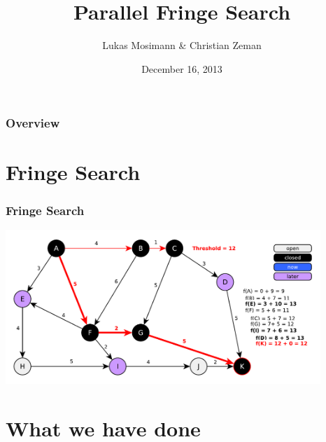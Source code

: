 \documentclass{beamer}
\title[Parallel Fringe Search]{Parallel Fringe Search} %
\author{Lukas Mosimann \& Christian Zeman} %
\institute[ETH] %
{
ETH Zürich \\ %
\medskip
\textit{Design of Parallel and High-Performance Computing} %
}
\date{December 16, 2013} %
\begin{document}
\begin{frame}
\titlepage %
\end{frame}

\begin{frame}
\frametitle{Overview} %
\tableofcontents %
\end{frame}


\section{Fringe Search} %

\begin{frame}
\frametitle{Fringe Search}
\includegraphics[height=165pt]{fringe7.pdf}
\end{frame}

\section{What we have done}
\end{document}

